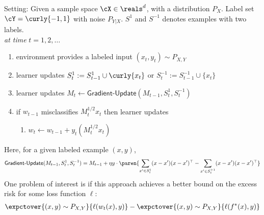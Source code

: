 \begin{shaded}
\noindent Setting: Given a sample space $\cX \in \reals^d$, with a distribution $P_X$. Label set $\cY = \curly{-1,1}$ with noise $P_{Y|X}$. $S^1$ and $S^{-1}$ denotes examples with two labels.\\

\noindent\textit{at time} $t = 1,2,\ldots$
\begin{enumerate}
    \item environment provides a labeled input $(x_t,y_t) \sim P_{X,Y}$
    \item learner updates $S^1_t:= S^1_{t-1} \cup \curly{x_t}$ or $S^{-1}_t:= S^{-1}_{t-1}  \cup \{x_t\}$ 
    \item learner updates $M_t \leftarrow \textsf{Gradient-Update}(M_{t-1}, S^1_t,S^{-1}_t)$ 
    \item if $w_{t-1}$ misclassifies $M_t^{1/2}x_t$ then learner updates
    \begin{enumerate}
        \item $w_t \leftarrow w_{t-1} + y_t(M_t^{1/2}x_t)$
    \end{enumerate}
\end{enumerate}
\end{shaded}
Here, for a given labeled example $(x,y)$,
\begin{align*}
\textsf{Gradient-Update}(M_{t-1}, S^1_t,S^{-1}_t) = M_{t-1} + \eta y\cdot\paren{ \sum_{x' \in S^1_t} (x - x')(x-x')^{\top} - \sum_{x' \in S^{+1}_t} (x - x')(x-x')^{\top}} 
\end{align*}
One problem of interest is if this approach achieves a better bound on the excess risk for some loss function $\ell$:
\begin{align*}
    \expctover{(x,y)\sim P_{X,Y}}{\ell(w_t(x),y)} - \expctover{(x,y)\sim P_{X,Y}}{\ell(f^*(x),y)}
\end{align*}


